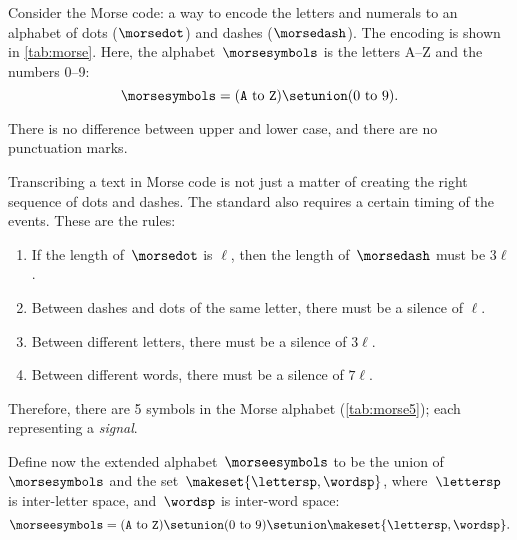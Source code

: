 \begin{example}
    \label{exa:morse-code}
    Consider the Morse code: a way to encode the letters and numerals to an alphabet of dots ($\morsedot$) and dashes ($\morsedash$).
    The encoding is shown in \cref{tab:morse}.
    Here, the alphabet~$\morsesymbols$ is the letters A--Z and the numbers 0--9:
    \begin{equation}
        \label{eq:morsesymbols}
        \morsesymbols = (\texttt{A} \ \text{to}\ \texttt{Z}) \setunion (0 \ \text{to}\ 9).
    \end{equation}

    There is no difference between upper and lower case, and there are no punctuation marks.

    Transcribing a text in Morse code is not just a matter of creating the right sequence of dots and dashes.
    The standard also requires a certain timing of the events.
    These are the rules:
    \begin{enumerate}
        \item If the length of~$\morsedot$ is $\ell$, then the length of~$\morsedash$ must be $3\ell$.
        \item Between dashes and dots of the same letter, there must be a silence of $\ell$.
        \item Between different letters, there must be a silence of $3\ell$.
        \item Between different words, there must be a silence of $7\ell$.
    \end{enumerate}

    Therefore, there are 5 symbols in the Morse alphabet (\cref{tab:morse5}); each representing a \emph{signal}.

    Define now the extended alphabet~$\morseesymbols$ to be the union of~$\morsesymbols$ and the set~$\makeset{\lettersp, \wordsp}$, where~$\lettersp$ is inter-letter space, and~$\wordsp$ is inter-word space:
    \begin{equation}
        \label{eq:morseesymbols}
        \morseesymbols = (\texttt{A} \ \text{to}\ \texttt{Z}) \setunion (0 \ \text{to}\ 9) \setunion \makeset{\lettersp, \wordsp}.
    \end{equation}


\end{example}
